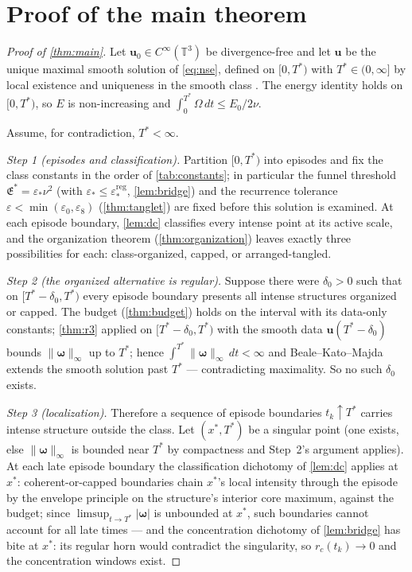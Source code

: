 \documentclass[11pt,letterpaper]{amsart}
\theoremstyle{definition}
\theoremstyle{remark}
\newcommand{\TT}{\mathbb{T}}
\newcommand{\vort}{\boldsymbol{\omega}}
\newcommand{\uu}{\boldsymbol{u}}
\newcommand{\norm}[1]{\lVert #1 \rVert}
\newcommand{\abs}[1]{\lvert #1 \rvert}
\begin{document}
\section{Proof of the main theorem}\label{sec:mainproof}

\begin{proof}[Proof of \cref{thm:main}]
Let $\uu_0\in C^\infty(\TT^3)$ be divergence-free and let $\uu$ be the unique maximal
smooth solution of \eqref{eq:nse}, defined on $[0,T^*)$ with $T^*\in(0,\infty]$ by
local existence and uniqueness in the smooth class
\cite{Leray1934,FujitaKato1964,Kato1984}. The energy identity holds on $[0,T^*)$, so
$E$ is non-increasing and $\int_0^{T^*}\Omega\,dt\le E_0/2\nu$.

Assume, for contradiction, $T^*<\infty$.

\emph{Step 1 (episodes and classification).} Partition $[0,T^*)$ into episodes and
fix the class constants in the order of \cref{tab:constants}; in particular the
funnel threshold $\mathfrak{E}^*=\varepsilon_*\nu^2$ (with
$\varepsilon_*\le\varepsilon_*^{\mathrm{reg}}$, \cref{lem:bridge}) and the
recurrence tolerance $\varepsilon<\min(\varepsilon_0,\varepsilon_8)$
(\cref{thm:tanglet}) are fixed before this solution is examined. At each episode
boundary, \cref{lem:dc} classifies every intense point at its active scale, and the
organization theorem (\cref{thm:organization}) leaves exactly three possibilities for
each: class-organized, capped, or arranged-tangled.

\emph{Step 2 (the organized alternative is regular).} Suppose there were
$\delta_0>0$ such that on $[T^*-\delta_0,T^*)$ every episode boundary presents all
intense structures organized or capped. The budget (\cref{thm:budget}) holds on the
interval with its data-only constants; \cref{thm:r3} applied on
$[T^*-\delta_0,T^*)$ with the smooth data $\uu(T^*-\delta_0)$ bounds
$\norm{\vort}_\infty$ up to $T^*$; hence
$\int^{T^*}\norm{\vort}_\infty\,dt<\infty$ and Beale--Kato--Majda
\cite{BealeKatoMajda1984} extends the smooth solution past $T^*$ --- contradicting
maximality. So no such $\delta_0$ exists.

\emph{Step 3 (localization).} Therefore a sequence of episode boundaries
$t_k\uparrow T^*$ carries intense structure outside the class. Let
$(x^*,T^*)$ be a singular point (one exists, else
$\norm{\vort}_\infty$ is bounded near $T^*$ by compactness and Step~2's argument
applies). At each late episode boundary the classification dichotomy of
\cref{lem:dc} applies at $x^*$: coherent-or-capped boundaries chain $x^*$'s
local intensity through the episode by the envelope principle on the structure's
interior core maximum, against the budget; since
$\limsup_{t\to T^*}\abs{\vort}$ is unbounded at $x^*$, such boundaries cannot
account for all late times --- and the concentration dichotomy of
\cref{lem:bridge} has bite at $x^*$: its regular horn would contradict the
singularity, so $r_c(t_k)\to0$ and the concentration windows exist.


\end{proof}
\end{document}
